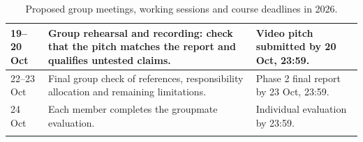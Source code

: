 {\begin{longtable}{@{}p{}p{}p{}@{}}
\midrule
19--20 Oct & Group rehearsal and recording: check that the pitch matches the report and qualifies untested claims. & Video pitch submitted by 20 Oct, 23:59. \\
\midrule
22--23 Oct & Final group check of references, responsibility allocation and remaining limitations. & Phase 2 final report by 23 Oct, 23:59. \\
\midrule
24 Oct & Each member completes the groupmate evaluation. & Individual evaluation by 23:59. \\
\bottomrule
\caption{Proposed group meetings, working sessions and course deadlines in 2026.}\\
\end{longtable}
}
